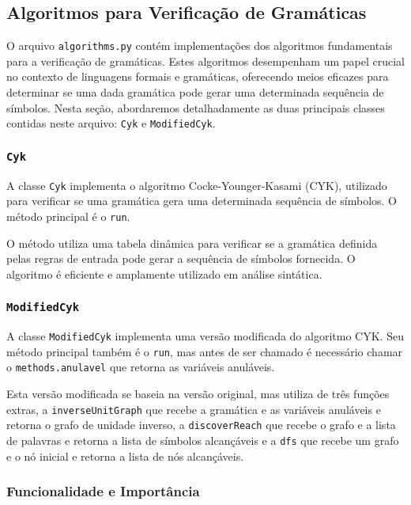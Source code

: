 \documentclass[a4paper,12pt]{article} %
\begin{document}
\subsection{Algoritmos para Verificação de Gramáticas}

O arquivo \texttt{algorithms.py} contém implementações dos algoritmos fundamentais para a verificação de gramáticas. Estes algoritmos desempenham um papel crucial no contexto de linguagens formais e gramáticas, oferecendo meios eficazes para determinar se uma dada gramática pode gerar uma determinada sequência de símbolos. Nesta seção, abordaremos detalhadamente as duas principais classes contidas neste arquivo: \texttt{Cyk} e \texttt{ModifiedCyk}.

\subsubsection{\texttt{Cyk}}

A classe \texttt{Cyk} implementa o algoritmo Cocke-Younger-Kasami (CYK), utilizado para verificar se uma gramática gera uma determinada sequência de símbolos. O método principal é o \texttt{run}.

O método utiliza uma tabela dinâmica para verificar se a gramática definida pelas regras de entrada pode gerar a sequência de símbolos fornecida. O algoritmo é eficiente e amplamente utilizado em análise sintática.

\subsubsection{\texttt{ModifiedCyk}}

A classe \texttt{ModifiedCyk} implementa uma versão modificada do algoritmo CYK. Seu método principal também é o \texttt{run}, mas antes de ser chamado é necessário chamar o \texttt{methods.anulavel} que retorna as variáveis anuláveis.

Esta versão modificada se baseia na versão original, mas utiliza de três funções extras, a \texttt{inverseUnitGraph} que recebe a gramática e as variáveis anuláveis e retorna o grafo de unidade inverso, a \texttt{discoverReach} que recebe o grafo e a lista de palavras e retorna a lista de símbolos alcançáveis e a \texttt{dfs} que recebe um grafo e o nó inicial e retorna a lista de nós alcançáveis.

\subsubsection{Funcionalidade e Importância}
\end{document}

